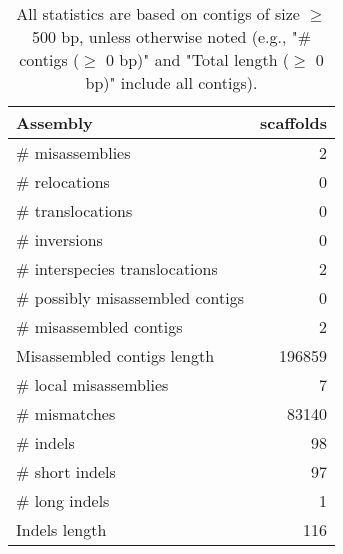 \documentclass[12pt,a4paper]{article}
\begin{document}
\begin{table}[ht]
\begin{center}
\caption{All statistics are based on contigs of size $\geq$ 500 bp, unless otherwise noted (e.g., "\# contigs ($\geq$ 0 bp)" and "Total length ($\geq$ 0 bp)" include all contigs).}
\begin{tabular}{|l*{1}{|r}|}
\hline
Assembly & scaffolds \\ \hline
\# misassemblies & 2 \\ \hline
\hspace{5mm}\# relocations & 0 \\ \hline
\hspace{5mm}\# translocations & 0 \\ \hline
\hspace{5mm}\# inversions & 0 \\ \hline
\hspace{5mm}\# interspecies translocations & 2 \\ \hline
\# possibly misassembled contigs & 0 \\ \hline
\# misassembled contigs & 2 \\ \hline
Misassembled contigs length & 196859 \\ \hline
\# local misassemblies & 7 \\ \hline
\# mismatches & 83140 \\ \hline
\# indels & 98 \\ \hline
\hspace{5mm}\# short indels & 97 \\ \hline
\hspace{5mm}\# long indels & 1 \\ \hline
Indels length & 116 \\ \hline
\end{tabular}
\end{center}
\end{table}
\end{document}
